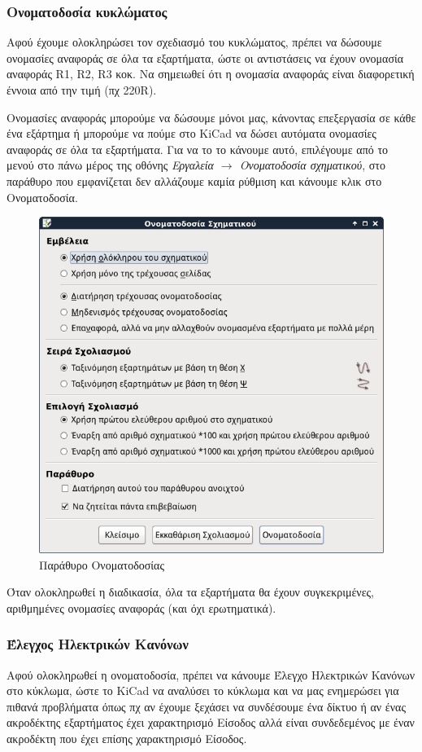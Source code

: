 \documentclass[a4paper]{article}
\begin{document}
\subsubsection{Ονοματοδοσία κυκλώματος}
Αφού έχουμε ολοκληρώσει τον σχεδιασμό του κυκλώματος, πρέπει να δώσουμε ονομασίες αναφοράς σε όλα τα εξαρτήματα, ώστε οι αντιστάσεις να έχουν ονομασία αναφοράς R1, R2, R3 κοκ. Να σημειωθεί ότι η ονομασία αναφοράς είναι διαφορετική έννοια από την τιμή (πχ 220R). 

Ονομασίες αναφοράς μπορούμε να δώσουμε μόνοι μας, κάνοντας επεξεργασία σε κάθε ένα εξάρτημα ή μπορούμε να πούμε στο \textenglish{KiCad} να δώσει αυτόματα ονομασίες αναφοράς σε όλα τα εξαρτήματα. Για να το το κάνουμε αυτό, επιλέγουμε από το μενού στο πάνω μέρος της οθόνης \textit{Εργαλεία $\rightarrow$ Ονοματοδοσία σχηματικού}, στο παράθυρο που εμφανίζεται δεν αλλάζουμε καμία ρύθμιση και κάνουμε κλικ στο Ονοματοδοσία.

\begin{figure}
  \begin{center}
    \includegraphics[width=.5\textwidth]{img/eesch-dial-annot.png}
    \caption{Παράθυρο Ονοματοδοσίας}
    \label{fig:eesch-dial-annot}
  \end{center}
\end{figure}

Όταν ολοκληρωθεί η διαδικασία, όλα τα εξαρτήματα θα έχουν συγκεκριμένες, αριθμημένες ονομασίες αναφοράς (και όχι ερωτηματικά).


\subsubsection{Έλεγχος Ηλεκτρικών Κανόνων}
Αφού ολοκληρωθεί η ονοματοδοσία, πρέπει να κάνουμε Έλεγχο Ηλεκτρικών Κανόνων στο κύκλωμα, ώστε το \textenglish{KiCad} να αναλύσει το κύκλωμα και να μας ενημερώσει για πιθανά προβλήματα όπως πχ αν έχουμε ξεχάσει να συνδέσουμε ένα δίκτυο ή αν ένας ακροδέκτης εξαρτήματος έχει χαρακτηρισμό Είσοδος αλλά είναι συνδεδεμένος με έναν ακροδέκτη που έχει επίσης χαρακτηρισμό Είσοδος.
\end{document}
